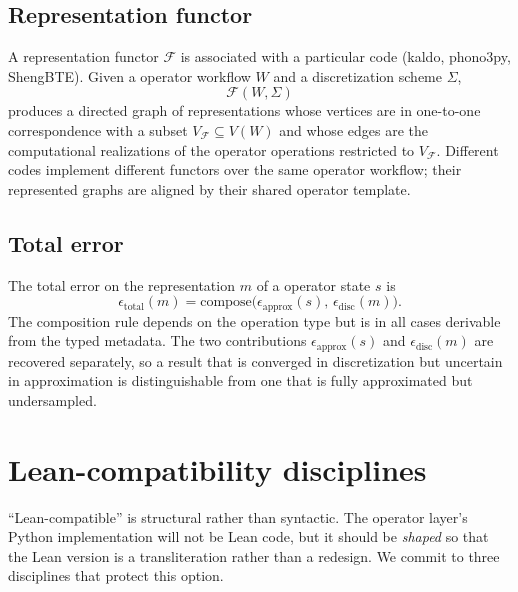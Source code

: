 \documentclass[11pt,a4paper]{article}
\begin{document}
\subsection{Representation functor}

A representation functor $\mathcal{F}$ is associated with a particular code (kaldo, phono3py,
ShengBTE). Given a operator workflow $W$ and a discretization scheme $\Sigma$,
\begin{equation}
  \mathcal{F}(W, \Sigma)
\end{equation}
produces a directed graph of representations whose vertices are in one-to-one correspondence
with a subset $V_{\mathcal{F}} \subseteq V(W)$ and whose edges are the computational realizations
of the operator operations restricted to $V_{\mathcal{F}}$. Different codes implement different
functors over the same operator workflow; their represented graphs are aligned by their shared
operator template.

\subsection{Total error}

The total error on the representation $m$ of a operator state $s$ is
\begin{equation}
  \epsilon_{\text{total}}(m)
  = \mathrm{compose}\bigl(\epsilon_{\text{approx}}(s),\, \epsilon_{\text{disc}}(m)\bigr).
\end{equation}
The composition rule depends on the operation type but is in all cases derivable from the
typed metadata. The two contributions $\epsilon_{\text{approx}}(s)$ and
$\epsilon_{\text{disc}}(m)$ are recovered separately, so a result that is converged in
discretization but uncertain in approximation is distinguishable from one that is fully
approximated but undersampled.


\section{Lean-compatibility disciplines}
\label{sec:lean-disciplines}

``Lean-compatible'' is structural rather than syntactic. The operator layer's Python implementation
will not be Lean code, but it should be \emph{shaped} so that the Lean version is a
transliteration rather than a redesign. We commit to three disciplines that protect this option.
\end{document}
